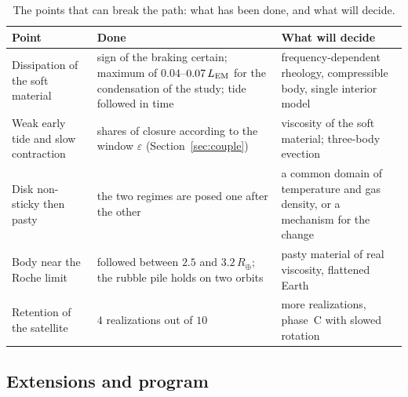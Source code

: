 \documentclass[11pt,a4paper]{article}
\newcommand{\Rt}{\ensuremath{R_\oplus}}
\newcommand{\LEM}{\ensuremath{L_{\rm EM}}}
\begin{document}
\begin{table}[htbp]
\centering
\caption{The points that can break the path: what has been done, and what will decide.\label{tab:faille}}
\small
\begin{tabular}{>{\raggedright\arraybackslash}p{3.2cm}>{\raggedright\arraybackslash}p{5.6cm}>{\raggedright\arraybackslash}p{5.8cm}}
\toprule
Point & Done & What will decide \\
\midrule
Dissipation of the soft material & sign of the braking certain; maximum of $0.04$--$0.07\,\LEM$ for the condensation of the study; tide followed in time & frequency-dependent rheology, compressible body, single interior model \\
Weak early tide and slow contraction & shares of closure according to the window $\varepsilon$ (Section~\ref{sec:couple}) & viscosity of the soft material; three-body evection \\
Disk non-sticky then pasty & the two regimes are posed one after the other & a common domain of temperature and gas density, or a mechanism for the change \\
Body near the Roche limit & followed between $2.5$ and $3.2\,\Rt$; the rubble pile holds on two orbits & pasty material of real viscosity, flattened Earth \\
Retention of the satellite & $4$ realizations out of $10$ & more realizations, phase~C with slowed rotation \\
\bottomrule
\end{tabular}
\end{table}

\subsection{Extensions and program}
\end{document}
